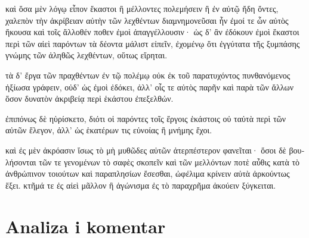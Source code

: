 {\large

\begin{greek}

\noindent καὶ ὅσα μὲν λόγῳ εἶπον ἕκαστοι ἢ μέλλοντες πολεμήσειν ἢ ἐν αὐτῷ ἤδη ὄντες, χαλεπὸν τὴν ἀκρίβειαν αὐτὴν τῶν λεχθέντων διαμνημονεῦσαι ἦν ἐμοί τε ὧν αὐτὸς ἤκουσα καὶ τοῖς ἄλλοθέν ποθεν ἐμοὶ ἀπαγγέλλουσιν· ὡς δ' ἂν ἐδόκουν ἐμοὶ ἕκαστοι περὶ τῶν αἰεὶ παρόντων τὰ δέοντα μάλιστ εἰπεῖν, ἐχομένῳ ὅτι ἐγγύτατα τῆς ξυμπάσης γνώμης τῶν ἀληθῶς λεχθέντων, οὕτως εἴρηται.

\noindent τὰ δ' ἔργα τῶν πραχθέντων ἐν τῷ πολέμῳ οὐκ ἐκ τοῦ παρατυχόντος πυνθανόμενος ἠξίωσα γράφειν, οὐδ' ὡς ἐμοὶ ἐδόκει, ἀλλ' οἷς τε αὐτὸς παρῆν καὶ παρὰ τῶν ἄλλων ὅσον δυνατὸν ἀκριβείᾳ περὶ ἑκάστου ἐπεξελθών.

\noindent ἐπιπόνως δὲ ηὑρίσκετο, διότι οἱ παρόντες τοῖς ἔργοις ἑκάστοις οὐ ταὐτὰ περὶ τῶν αὐτῶν ἔλεγον, ἀλλ' ὡς ἑκατέρων τις εὐνοίας ἢ μνήμης ἔχοι.

\noindent καὶ ἐς μὲν ἀκρόασιν ἴσως τὸ μὴ μυθῶδες αὐτῶν ἀτερπέστερον φανεῖται· ὅσοι δὲ βουλήσονται τῶν τε γενομένων τὸ σαφὲς σκοπεῖν καὶ τῶν μελλόντων ποτὲ αὖθις κατὰ τὸ ἀνθρώπινον τοιούτων καὶ παραπλησίων ἔσεσθαι, ὠφέλιμα κρίνειν αὐτὰ ἀρκούντως ἕξει. κτῆμά τε ἐς αἰεὶ μᾶλλον ἢ ἀγώνισμα ἐς τὸ παραχρῆμα ἀκούειν ξύγκειται.

\end{greek}

}


\section*{Analiza i komentar}


